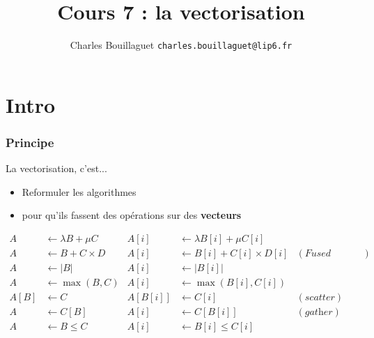 \documentclass[xcolor={x11names,svgnames}]{beamer}
\author[C.~Bouillaguet]{Charles Bouillaguet \newline
  {\small \texttt{charles.bouillaguet@lip6.fr}}}
\title{Cours 7 : la \og vectorisation\fg}
\begin{document}
\frame{\titlepage}

\section{Intro}


\begin{frame}
  \frametitle{Principe}

  \begin{block}{La vectorisation, c'est...}
    \begin{itemize}
    \item Reformuler les algorithmes
    \item pour qu'ils fassent des opérations sur des \textbf{vecteurs}
    \end{itemize}
     
  \end{block}

  \begin{align*}
    A &\gets \lambda B + \mu C & A[i] &\gets \lambda B[i] + \mu C[i]\\
    A &\gets B + C \times D    & A[i] &\gets B[i] + C[i] \times D[i] & (\textit{Fused Multiply-Add}) \\
    A &\gets |B|               & A[i] &\gets |B[i]|  \\
    A &\gets \max(B, C)        & A[i] &\gets \max(B[i], C[i])  \\
    A[B] &\gets C              & A[B[i]] &\gets C[i] & (\textit{scatter}) \\
    A &\gets C[B]              & A[i] &\gets C[B[i]] & (\textit{gather}) \\
    A &\gets B \leq C          & A[i] &\gets B[i] \leq C[i]  \\
  \end{align*}

\end{frame}

\end{document}
